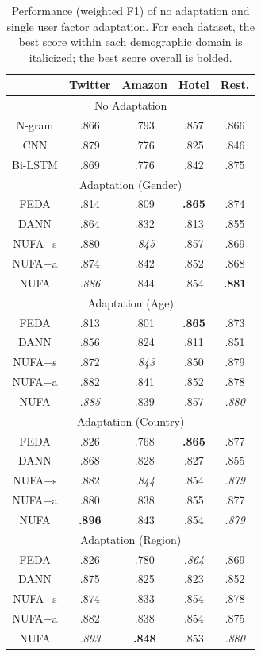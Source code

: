 \begin{table}[tb!]
\centering
\begin{tabular}{c|c|c|c|c}
 & Twitter & Amazon & Hotel & Rest. \\\hline
 \multicolumn{5}{c}{No Adaptation} \\\hline
N-gram & .866 & .793 & .857 & .866 \\
CNN & .879 & .776 & .825 & .846 \\
Bi-LSTM & .869 & .776 & .842 & .875 \\\hline
\multicolumn{5}{c}{Adaptation (Gender)} \\\hline
FEDA & .814 & .809 & \textbf{.865} & .874 \\
DANN & .864 & .832 & .813 & .855 \\ \hline
NUFA$-$s & .880 & \em .845 & .857 & .869 \\
NUFA$-$a & .874 & .842 & .852 & .868 \\
NUFA & \em .886 & .844 & .854 & \textbf{.881} \\ \hline
\multicolumn{5}{c}{Adaptation (Age)} \\\hline
FEDA & .813 & .801 & \bf .865 & .873 \\
DANN & .856 & .824 & .811 & .851 \\ \hline
NUFA$-$s & .872 & \em .843 & .850 & .879 \\
NUFA$-$a & .882 & .841 & .852 & .878 \\
NUFA & \em .885 & .839 & .857 & \em .880 \\ \hline
\multicolumn{5}{c}{Adaptation (Country)} \\\hline
FEDA & .826 & .768 & \bf .865 & .877 \\
DANN & .868 & .828 & .827 & .855 \\ \hline
NUFA$-$s & .882 & \em .844 & .854 & \em .879 \\
NUFA$-$a & .880 & .838 & .855 & .877 \\
NUFA & \textbf{.896} & .843 & .854 & \em .879 \\ \hline
\multicolumn{5}{c}{Adaptation (Region)} \\\hline
FEDA & .826 & .780 & \em .864 & .869 \\
DANN & .875 & .825 & .823 & .852 \\\hline
NUFA$-$s & .874 & .833 & .854 & .878 \\
NUFA$-$a & .882 & .838 & .854 & .875 \\
NUFA & \em .893 & \textbf{.848} & .853 & \em .880\\ \hline
\end{tabular}
\caption{Performance (weighted F1) of no adaptation and single user factor adaptation.
For each dataset, the best score within each demographic domain is italicized; the best score overall is bolded.
}
\label{table:single}
\end{table}

